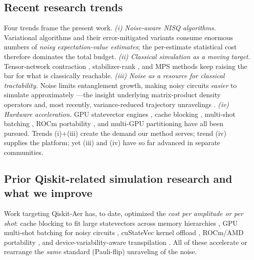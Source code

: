 \documentclass{ieeeaccess}
\begin{document}
\subsection{Recent research trends}
Four trends frame the present work. \emph{(i) Noise-aware NISQ algorithms.} Variational algorithms and
their error-mitigated variants \cite{cerezo2021vqa,bharti2022nisq,endo2021mitigation} consume enormous
numbers of \emph{noisy expectation-value estimates}; the per-estimate statistical cost therefore dominates
the total budget. \emph{(ii) Classical simulation as a moving target.} Tensor-network contraction
\cite{markov2008tensor,gray2021hyper,pan2022sycamore}, stabilizer-rank
\cite{aaronson2004stabilizer,bravyi2016clifford}, and MPS methods \cite{vidal2003,schollwock2011dmrg,
cirac2021mps,zhou2020} keep raising the bar for what is classically reachable. \emph{(iii) Noise as a
resource for classical tractability.} Noise limits entanglement growth, making noisy circuits
\emph{easier} to simulate approximately \cite{noh2020,zhou2020}---the insight underlying matrix-product
density operators \cite{verstraete2004mpdo,zwolak2004mixed,mpdo_prr,lpdo2023,mpdo_tomography2025} and,
most recently, variance-reduced trajectory unravelings \cite{tjm2026}. \emph{(iv) Hardware acceleration.}
GPU statevector engines \cite{cuquantum2023,quest2019,intelqs2020,haner2017}, cache blocking
\cite{cacheblocking2020}, multi-shot batching \cite{efficient_multishot2023}, ROCm portability
\cite{rocm_qiskit2024}, and multi-GPU partitioning \cite{atlas_sc24,questab_ics25,multigpu_network2025}
have all been pursued. Trends (i)+(iii) create the demand our method serves; trend (iv) supplies the
platform; yet (iii) and (iv) have so far advanced in separate communities.

\subsection{Prior Qiskit-related simulation research and what we improve}
Work targeting Qiskit-Aer has, to date, optimized the \emph{cost per amplitude or per shot}:
cache blocking to fit large statevectors across memory hierarchies \cite{cacheblocking2020}, GPU
multi-shot batching for noisy circuits \cite{efficient_multishot2023}, cuStateVec kernel offload
\cite{cuquantum2023}, ROCm/AMD portability \cite{rocm_qiskit2024}, and device-variability-aware
transpilation \cite{nation2023suppressing}. All of these accelerate or rearrange the \emph{same}
standard (Pauli-flip) unraveling of the noise.
\end{document}
